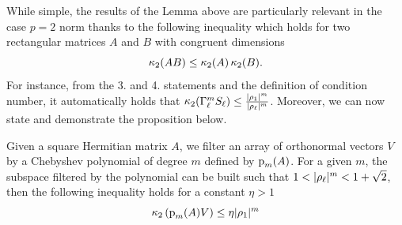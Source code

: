 While simple, the results of the Lemma above are particularly relevant in the case $p=2$ norm thanks to the following inequality which holds for two rectangular matrices $A$ and $B$ with congruent dimensions
\begin{equation}
\label{eq-2-2-3}
\mathop\mathrm{\kappa}_2\nolimits(AB) \leq \mathop\mathrm{\kappa}_2\nolimits(A) \mathop\mathrm{\kappa}_2\nolimits(B).
\end{equation}
For instance, from the 3. and 4. statements and the definition of condition number, it automatically holds that $\mathop\mathrm{\kappa}_2\nolimits(\Gamma_\ell^m S_\ell) \leq \frac{|\rho_{1}|^{m}}{|\rho_{\ell}|^{m}}$. Moreover, we can now state and demonstrate the proposition below.

\begin{proposition}
\label{th:2-2}
Given a square Hermitian matrix $A$, we filter an array of orthonormal vectors $V$ by a Chebyshev polynomial of degree $m$ defined by ${\textrm p}_{m} (A)$. For a given $m$, the subspace filtered by the polynomial can be built such that $1 < |\rho_{\ell}|^{m} < 1 + \sqrt{2}$, then the following inequality holds for a constant $\eta > 1$ 
\begin{equation}
\mathop\mathrm{\kappa}_2\nolimits \left({\textrm p}_{m} (A)V\right) \leq \eta |\rho_{1}|^{m}
\end{equation}
\end{proposition}
